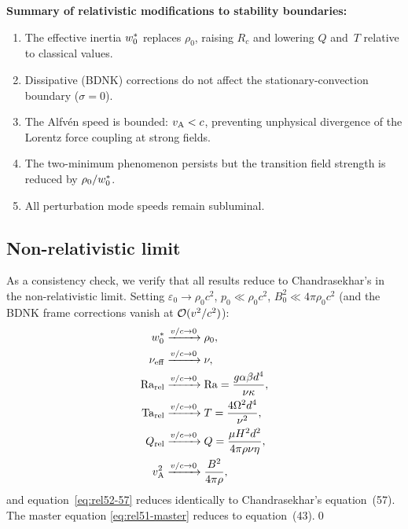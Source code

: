 \begin{relcorrection}
\textbf{Summary of relativistic modifications to stability
boundaries:}
\begin{enumerate}
\item The effective inertia $w^{*}_{0}$ replaces $\rho_{0}$,
  raising $R_{c}$ and lowering $Q$ and~$T$ relative to classical
  values.
\item Dissipative (BDNK) corrections do not affect the
  stationary-convection boundary ($\sigma=0$).
\item The Alfv\'en speed is bounded: $v_{\mathrm{A}} < c$, preventing unphysical
  divergence of the Lorentz force coupling at strong fields.
\item The two-minimum phenomenon persists but the transition field
  strength is reduced by $\rho_{0}/w^{*}_{0}$.
\item All perturbation mode speeds remain subluminal.
\end{enumerate}
\end{relcorrection}

\subsection{Non-relativistic limit}
\label{sec:NR-limit}

As a consistency check, we verify that all results reduce to
Chandrasekhar's in the non-relativistic limit.  Setting
$\varepsilon_{0}\to\rho_{0}c^{2}$, $p_{0}\ll\rho_{0}c^{2}$,
$B_{0}^{2}\ll 4\pi\rho_{0}c^{2}$ (and the BDNK frame corrections
vanish at $\mathcal{O}(v^{2}/c^{2})$):
\begin{align}
  w^{*}_{0} &\xrightarrow{v/c \to 0} \rho_{0},\\
  \nu_{\mathrm{eff}} &\xrightarrow{v/c \to 0} \nu,\\
  \mathrm{Ra}_{\mathrm{rel}} &\xrightarrow{v/c \to 0} \mathrm{Ra} = \frac{g\alpha\beta d^{4}}{\nu\kappa},\\
  \mathrm{Ta}_{\mathrm{rel}} &\xrightarrow{v/c \to 0} T = \frac{4\Omega^{2}d^{4}}{\nu^{2}},\\
  Q_{\mathrm{rel}} &\xrightarrow{v/c \to 0} Q = \frac{\mu H^{2}d^{2}}{4\pi\rho\nu\eta},\\
  v_{\mathrm{A}}^{2} &\xrightarrow{v/c \to 0} \frac{B^{2}}{4\pi\rho},
\end{align}
and equation~\eqref{eq:rel52-57} reduces identically to
Chandrasekhar's equation~(57).  The master equation
\eqref{eq:rel51-master} reduces to equation~(43).\qed

